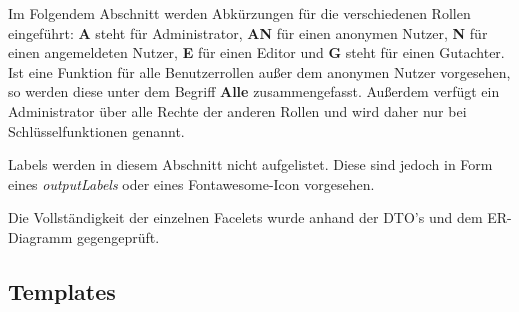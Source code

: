 \newcommand{\ftable}[1]{\begin{longtable}[H]{|m{2cm}|m{3cm}|m{6cm}|m{2.5cm}|}
                            \hline
                            \textbf{ID} & \textbf{Typ} & \textbf{Beschreibung} & \textbf{Rechte} \\
                            \hline
                            \hline
                            #1
\end{longtable}
}

\newcommand{\fentry}[4]{#1 & #2 & #3 & #4 \\
\hline}



Im Folgendem Abschnitt werden Abkürzungen für die verschiedenen Rollen eingeführt:
\textbf{A} steht für Administrator, \textbf{AN} für einen anonymen Nutzer, \textbf{N} für einen angemeldeten Nutzer, \textbf{E} für einen Editor und \textbf{G} steht für einen Gutachter.
Ist eine Funktion für alle Benutzerrollen außer dem anonymen Nutzer vorgesehen, so werden diese unter dem Begriff \textbf{Alle} zusammengefasst.
Außerdem verfügt ein Administrator über alle Rechte der anderen Rollen und wird daher nur bei Schlüsselfunktionen genannt.

Labels werden in diesem Abschnitt nicht aufgelistet.
Diese sind jedoch in Form eines \emph{outputLabels} oder eines Fontawesome-Icon vorgesehen.

Die Vollständigkeit der einzelnen Facelets wurde anhand der DTO's und dem ER-Diagramm gegengeprüft.

\subsection{Templates}



